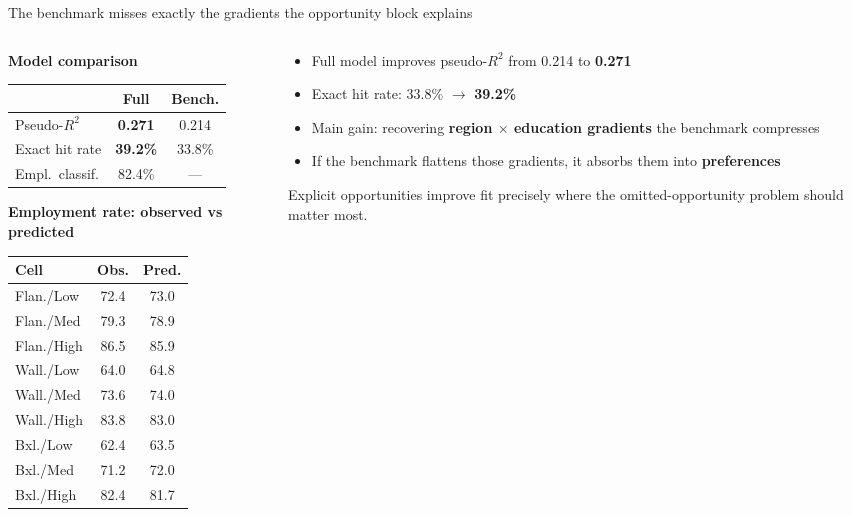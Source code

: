 \documentclass[aspectratio=169,11pt]{beamer}
\newcommand{\emphnum}[1]{\textcolor{cblue}{\textbf{#1}}}
\begin{document}
\begin{frame}{The benchmark misses exactly the gradients the opportunity block explains}

\begin{columns}[T]
\begin{column}{0.48\textwidth}
\scriptsize
\textbf{Model comparison}\\[2pt]
\begin{tabular}{@{}l cc@{}}
\toprule
 & \textbf{Full} & \textbf{Bench.} \\
\midrule
Pseudo-$R^2$    & \emphnum{0.271} & 0.214 \\
Exact hit rate   & \emphnum{39.2\%} & 33.8\% \\
Empl.\ classif. & 82.4\% & --- \\
\bottomrule
\end{tabular}

\medskip
\textbf{Employment rate: observed vs predicted}\\[2pt]
\begin{tabular}{@{}l cc@{}}
\toprule
\textbf{Cell} & \textbf{Obs.} & \textbf{Pred.} \\
\midrule
Flan./Low   & 72.4 & 73.0 \\
Flan./Med   & 79.3 & 78.9 \\
Flan./High  & 86.5 & 85.9 \\
Wall./Low   & 64.0 & 64.8 \\
Wall./Med   & 73.6 & 74.0 \\
Wall./High  & 83.8 & 83.0 \\
Bxl./Low    & 62.4 & 63.5 \\
Bxl./Med    & 71.2 & 72.0 \\
Bxl./High   & 82.4 & 81.7 \\
\bottomrule
\end{tabular}
\end{column}
\begin{column}{0.48\textwidth}
\begin{itemize}\footnotesize
\item Full model improves pseudo-$R^2$ from 0.214 to \emphnum{0.271}
\item Exact hit rate: 33.8\% $\rightarrow$ \emphnum{39.2\%}
\item Main gain: recovering \textbf{region $\times$ education gradients} the benchmark compresses
\item If the benchmark flattens those gradients, it absorbs them into \textbf{preferences}
\end{itemize}

\medskip
\scriptsize
\textcolor{cgrey}{Explicit opportunities improve fit precisely where the omitted-opportunity problem should matter most.}
\end{column}
\end{columns}
\end{frame}
\end{document}
